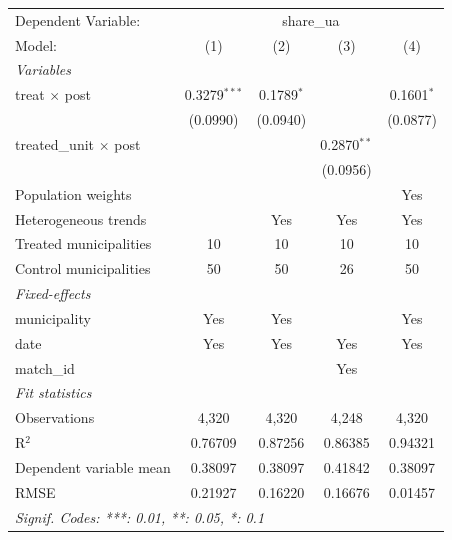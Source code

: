 
\begingroup
\centering
\begin{tabular}{lcccc}
   \tabularnewline \midrule \midrule
   Dependent Variable: & \multicolumn{4}{c}{share\_ua}\\
   Model:                        & (1)            & (2)          & (3)           & (4)\\  
   \midrule
   \emph{Variables}\\
   treat $\times$ post           & 0.3279$^{***}$ & 0.1789$^{*}$ &               & 0.1601$^{*}$\\   
                                 & (0.0990)       & (0.0940)     &               & (0.0877)\\   
   treated\_unit $\times$ post   &                &              & 0.2870$^{**}$ &   \\   
                                 &                &              & (0.0956)      &   \\   
   Population weights            &                &              &               & Yes\\  
   Heterogeneous trends          &                & Yes          & Yes           & Yes\\  
   Treated municipalities        & 10             & 10           & 10            & 10\\  
   Control municipalities        & 50             & 50           & 26            & 50\\  
   \midrule
   \emph{Fixed-effects}\\
   municipality                  & Yes            & Yes          &               & Yes\\  
   date                          & Yes            & Yes          & Yes           & Yes\\  
   match\_id                     &                &              & Yes           & \\  
   \midrule
   \emph{Fit statistics}\\
   Observations                  & 4,320          & 4,320        & 4,248         & 4,320\\  
   R$^2$                         & 0.76709        & 0.87256      & 0.86385       & 0.94321\\  
   Dependent variable mean       & 0.38097        & 0.38097      & 0.41842       & 0.38097\\  
   RMSE                          & 0.21927        & 0.16220      & 0.16676       & 0.01457\\  
   \midrule \midrule
   \multicolumn{5}{l}{\emph{Signif. Codes: ***: 0.01, **: 0.05, *: 0.1}}\\
\end{tabular}
\par\endgroup


